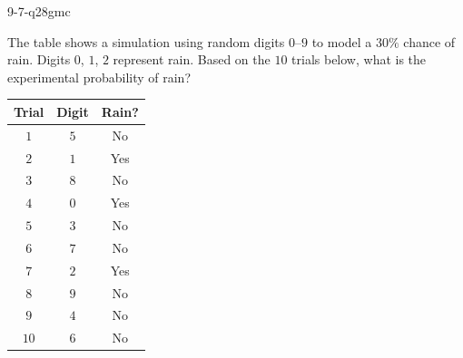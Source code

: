 \begin{practiceQuestion}{9-7-q28}{gmc}
\begin{questionText}
The table shows a simulation using random digits $0$--$9$ to model a $30\%$ chance of rain. Digits $0$, $1$, $2$ represent rain. Based on the $10$ trials below, what is the experimental probability of rain?

\begin{center}
\begin{tabular}{|c|c|c|}
\hline
\textbf{Trial} & \textbf{Digit} & \textbf{Rain?} \\
\hline
$1$ & $5$ & No \\
\hline
$2$ & $1$ & Yes \\
\hline
$3$ & $8$ & No \\
\hline
$4$ & $0$ & Yes \\
\hline
$5$ & $3$ & No \\
\hline
$6$ & $7$ & No \\
\hline
$7$ & $2$ & Yes \\
\hline
$8$ & $9$ & No \\
\hline
$9$ & $4$ & No \\
\hline
$10$ & $6$ & No \\
\hline
\end{tabular}
\end{center}
\end{questionText}
\end{practiceQuestion}
